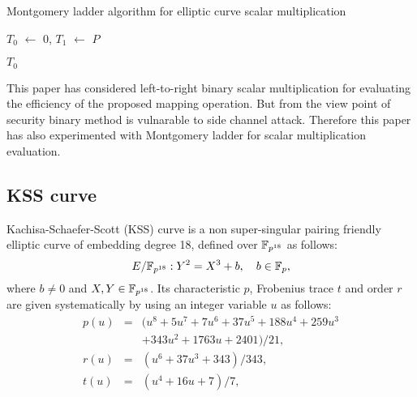          \begin{algorithm}[H]
          \caption{Montgomery ladder algorithm for elliptic curve scalar multiplication}
          \label{alg:mont}
          \DontPrintSemicolon
          \hspace{-3ex}
          \;
          \hspace{-3ex}
           \;%
          \nl $T_0$ $ \leftarrow$ $0$, $T_1$ $\leftarrow$ $P$ \;
          \nl {} {\;
         
                    {
                }
          }\;
          \nl {} $T_0$\;
        \end{algorithm}
        This paper has considered left-to-right binary scalar multiplication for evaluating the efficiency of the proposed mapping operation. But from the view point of security binary method is vulnarable to side channel attack. Therefore this paper has also experimented with Montgomery ladder \cite{Silverman} for scalar multiplication evaluation.
        
        \subsection{KSS curve}
        Kachisa-Schaefer-Scott (KSS) curve \cite{EPRINT:KacSchSco07} is a non super-singular pairing friendly elliptic curve of embedding degree 18, defined over $\mathbb{F}_{p^{18}}$ as follows: 
        \begin{equation}\label{eq:KSS_curve}
        E/\mathbb{F}_{p^{18}}:Y^2=X^3+b, \quad \mbox{$b \in {\mathbb{F}}_{p}$},
        \end{equation}
        where $b \neq 0$ and $X,Y \in \mathbb{F}_{p^{18}}$. Its characteristic $p$, Frobenius trace $t$ and order $r$ are given systematically by using an integer variable $u$ as follows:
        \begin{subequations}
        \begin{eqnarray}
        p(u) &= & (u^8 +5u^7 +7u^6 +37u^5 +188u^4 +259u^3 \nonumber \\
        & & + 343u^2 +1763u+2401)/21,\\\label{eq:kss_char}
        r(u) &= &(u^6 + 37u^3 + 343)/343,\label{eq:kss_degree}  \\
        t(u) &=& (u^4 + 16u + 7)/7, \label{eq:kss_trace} 
        \end{eqnarray}
        \end{subequations} 
        
